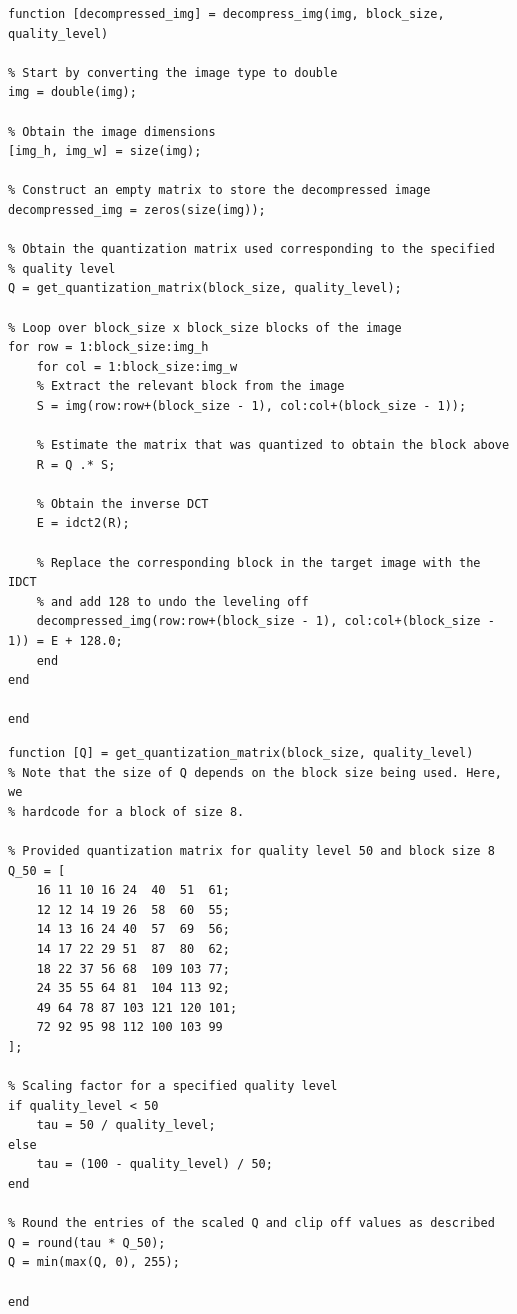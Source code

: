 \documentclass{article}[a4paper]
\begin{document}
	\begin{lstlisting}[caption={Image Decompression}, label=decompress]
function [decompressed_img] = decompress_img(img, block_size, quality_level)

% Start by converting the image type to double
img = double(img);

% Obtain the image dimensions
[img_h, img_w] = size(img);

% Construct an empty matrix to store the decompressed image
decompressed_img = zeros(size(img));

% Obtain the quantization matrix used corresponding to the specified
% quality level
Q = get_quantization_matrix(block_size, quality_level);

% Loop over block_size x block_size blocks of the image
for row = 1:block_size:img_h
	for col = 1:block_size:img_w
	% Extract the relevant block from the image
	S = img(row:row+(block_size - 1), col:col+(block_size - 1));
	
	% Estimate the matrix that was quantized to obtain the block above
	R = Q .* S;
	
	% Obtain the inverse DCT
	E = idct2(R);
	
	% Replace the corresponding block in the target image with the IDCT
	% and add 128 to undo the leveling off
	decompressed_img(row:row+(block_size - 1), col:col+(block_size - 1)) = E + 128.0;
	end
end

end
	\end{lstlisting}
	
	\begin{lstlisting}[caption={Generation of Quantization Matrix}, label=get_quantization_mat]
function [Q] = get_quantization_matrix(block_size, quality_level)
% Note that the size of Q depends on the block size being used. Here, we
% hardcode for a block of size 8.

% Provided quantization matrix for quality level 50 and block size 8
Q_50 = [
	16 11 10 16 24  40  51  61;
	12 12 14 19 26  58  60  55;
	14 13 16 24 40  57  69  56;
	14 17 22 29 51  87  80  62;
	18 22 37 56 68  109 103 77;
	24 35 55 64 81  104 113 92;
	49 64 78 87 103 121 120 101;
	72 92 95 98 112 100 103 99
];

% Scaling factor for a specified quality level
if quality_level < 50
	tau = 50 / quality_level;
else
	tau = (100 - quality_level) / 50;
end

% Round the entries of the scaled Q and clip off values as described
Q = round(tau * Q_50);
Q = min(max(Q, 0), 255);

end
	\end{lstlisting}
	
\end{document}
